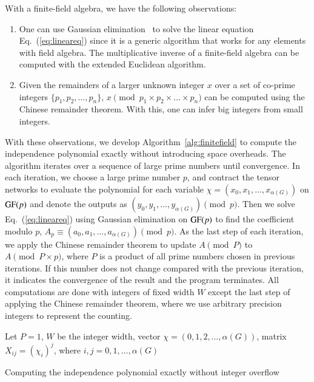 \documentclass[onefignum, onetabnum]{siamart190516}
\newcommand{\<}{\langle}
\renewcommand{\>}{\rangle}
\newcommand{\Eq}[1]{Eq.~(\ref{#1})}
\begin{document}
With a finite-field algebra, we have the following observations:
\begin{enumerate}
    \item One can use Gaussian elimination~\cite{Golub2013} to solve the linear equation \Eq{eq:lineareq} since it is a generic algorithm that works for any elements with field algebra. The multiplicative inverse of a finite-field algebra can be computed with the extended Euclidean algorithm.
    \item Given the remainders of a larger unknown integer $x$ over a set of co-prime integers $\{p_1, p_2, \ldots, p_n\}$,
    $x \pmod {p_1 \times p_2 \times \ldots \times p_n}$ can be computed using the Chinese remainder theorem. With this, one can infer big integers from small integers.
\end{enumerate}
With these observations, we develop Algorithm~\ref{alg:finitefield} to compute the independence polynomial exactly without introducing space overheads.
The algorithm iterates over a sequence of large prime numbers until convergence.
In each iteration, we choose a large prime number $p$, and contract the tensor networks to evaluate the polynomial for each variable $\chi = (x_{0}, x_{1}, \ldots, x_{\alpha(G)})$ on ${\rm GF}(p)$ and denote the outputs as $(y_0, y_1, \ldots, y_{\alpha(G)}) \pmod p$.
Then we solve \Eq{eq:lineareq} using Gaussian elimination on ${\rm GF}(p)$ to find the coefficient modulo $p$, $A_p \equiv (a_0, a_1, \ldots, a_{\alpha(G)})\pmod p$.
As the last step of each iteration, we apply the Chinese remainder theorem to update $A \pmod P $ to $ A \pmod {P\times p}$, where $P$ is a product of all prime numbers chosen in previous iterations.
If this number does not change compared with the previous iteration, it indicates the convergence of the result and the program terminates.
All computations are done with integers of fixed width $W$ except the last step of applying the Chinese remainder theorem, where we use arbitrary precision integers to represent the counting.

\LinesNumberedHidden
\begin{algorithm}[!ht]
    \small
    \SetAlgoNoLine
    Let $P = 1$, $W$ be the integer width, vector $\chi = (0,1,2, \ldots, \alpha(G))$, matrix $X_{ij} = (\chi_i)^j$, where $i,j = 0, 1, \ldots, \alpha(G)$\;

    \caption{Computing the independence polynomial exactly without integer overflow}\label{alg:finitefield} 
\end{algorithm}
\end{document}
